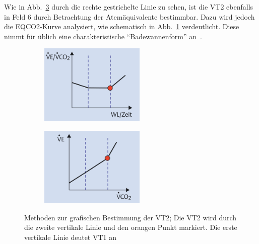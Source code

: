 Wie in Abb.~\ref{pic:pic5} durch die rechte gestrichelte Linie zu sehen, ist die VT2 ebenfalls in Feld 6 durch Betrachtung der Atemäquivalente bestimmbar. Dazu wird jedoch die \acs{EQCO2}-Kurve analysiert, wie schematisch in Abb.~\ref{subpic:pic7} verdeutlicht. Diese nimmt für üblich eine charakteristische "`Badewannenform"' an~\cite{Kroidl.2015}.
%
\begin{figure}[H]
	\centering
	\begin{subfigure}[c]{0.45\textwidth}
		\centering
		\includegraphics[width=50mm]{Bilder/eqco2.png}
		\label{subpic:pic7}
	\end{subfigure}%
	\hfil
	\begin{subfigure}[c]{0.45\textwidth}
		\centering
		\includegraphics[width=50mm]{Bilder/field4.png}
		\label{subpic:pic8}
	\end{subfigure}
	\caption[Methoden zur grafischen Bestimmung der VT2]{Methoden zur grafischen Bestimmung der VT2; Die VT2 wird durch die zweite vertikale Linie und den orangen Punkt markiert. Die erste vertikale Linie deutet VT1 an~\cite{Kroidl.2015}}
	\label{pic:pic5}
\end{figure}
%
